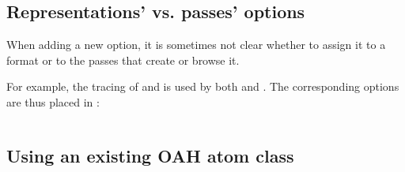 \subsection{Representations' vs. passes' options}

When adding a new option, it is sometimes not clear whether to assign it to a format or to the passes that create or browse it.

For example, the tracing of  and  is used by both  and . The corresponding options are thus placed in :
\begin{lstlisting}[language=CPlusPlus]

\end{lstlisting}


\subsection{Using an existing OAH atom class}

